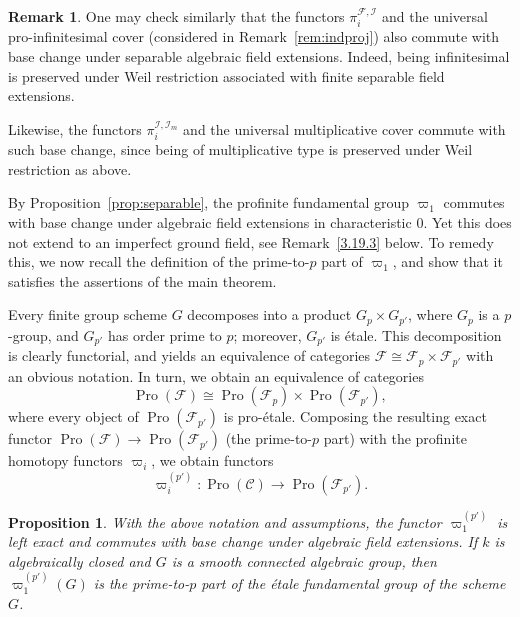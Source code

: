 \documentclass[11pt]{article}
\newtheorem{prop}[theo]{Proposition}
\theoremstyle{definition}
\newtheorem{rema}[theo]{Remark}
\numberwithin{equation}{section}
\newcommand\cC{{\mathcal C}}
\newcommand\cF{{\mathcal F}}
\newcommand\cI{{\mathcal I}}
\DeclareMathOperator{\Pro}{Pro}
\theoremstyle{remark}
\begin{document}
\begin{rema}\label{rem:separable}
One may check similarly that the functors $\pi_i^{\cF,\cI}$ and the universal pro-infinitesimal cover (considered in Remark~\ref{rem:indproj}) also commute with base change under separable algebraic field extensions. Indeed, being infinitesimal is preserved under Weil restriction associated with finite separable field extensions.

Likewise, the functors $\pi_i^{\cI,\cI_m}$ and the universal multiplicative cover commute with such base change, since being of multiplicative type is preserved under Weil restriction as above.
\end{rema}

By Proposition~\ref{prop:separable}, the profinite fundamental group $\varpi_1$ commutes with base change under algebraic field extensions in characteristic $0$. Yet this does not extend to an imperfect ground field, see Remark~\ref{3.19.3} below. To remedy this, we now recall the definition of the prime-to-$p$ part of $\varpi_1$, and show that it satisfies the assertions of the main theorem.

Every finite group scheme $G$ decomposes into a product $G_p \times G_{p'}$, where $G_p$ is a $p$-group, and $G_{p'}$ has order prime to $p$; moreover, $G_{p'}$ is \'etale. This decomposition is clearly functorial, and yields an equivalence of categories $\cF \cong \cF_p \times \cF_{p'}$ with an obvious notation. In turn, we obtain an equivalence of categories
\[
\Pro(\cF) \cong \Pro(\cF_p) \times \Pro(\cF_{p'}),
\]
where every object of $\Pro(\cF_{p'})$ is pro-\'etale. Composing the resulting exact functor $\Pro(\cF) \to \Pro(\cF_{p'})$ (the prime-to-$p$ part) with the profinite homotopy functors $\varpi_i$, we obtain functors
\[
\varpi_i^{(p')} : \Pro(\cC) \longrightarrow \Pro(\cF_{p'}).
\]

\begin{prop}\label{prop:p'}
With the above notation and assumptions, the functor $\varpi_1^{(p')}$ is left exact and commutes with base change under algebraic field extensions. If $k$ is algebraically closed and $G$ is a smooth connected algebraic group, then $\varpi_1^{(p')}(G)$ is the prime-to-$p$ part of the \'etale fundamental group of the scheme $G$.
\end{prop}
\end{document}
